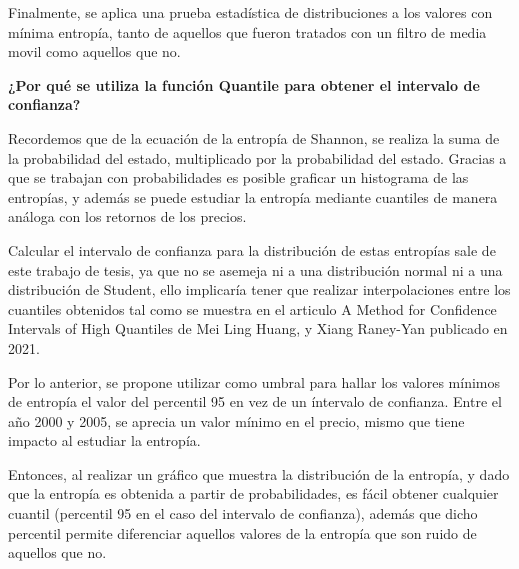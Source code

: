 Finalmente, se aplica una prueba estadística de distribuciones a los valores con mínima entropía, tanto de aquellos que fueron tratados con un filtro de media movil como aquellos que no. 


\textbf{¿Por qué se utiliza la función Quantile para obtener el intervalo de confianza?}



Recordemos que de la ecuación de la entropía de Shannon, se realiza la suma de la probabilidad del estado, multiplicado por la probabilidad del estado. Gracias a que se trabajan con probabilidades es posible graficar un histograma de las entropías, y además se puede estudiar la entropía mediante cuantiles de manera análoga con los retornos de los precios.

Calcular el intervalo de confianza para la distribución de estas entropías sale de este trabajo de tesis, ya que no se asemeja ni a una distribución normal ni a una distribución de Student, ello implicaría tener que realizar interpolaciones entre los cuantiles obtenidos tal como se muestra en el articulo A Method for Confidence Intervals of High Quantiles de Mei Ling Huang, y Xiang Raney-Yan publicado en 2021. 

Por lo anterior, se propone utilizar como umbral para hallar los valores mínimos de entropía el valor del percentil 95 en vez de un íntervalo de confianza. Entre el año 2000 y 2005, se aprecia un valor mínimo en el precio, mismo que tiene impacto al estudiar la entropía.


Entonces, al realizar un gráfico que muestra la distribución de la entropía, y dado que la entropía es obtenida a partir de probabilidades, es fácil obtener cualquier cuantil (percentil 95 en el caso del intervalo de confianza), además que dicho percentil permite diferenciar aquellos valores de la entropía que son ruido de aquellos que no. 

